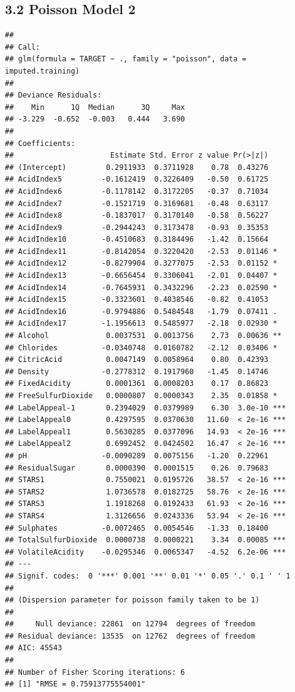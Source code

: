 \documentclass[]{article}
\begin{document}
\hypertarget{poisson-model-2}{%
\subsection{3.2 Poisson Model 2}\label{poisson-model-2}}

\begin{verbatim}
## 
## Call:
## glm(formula = TARGET ~ ., family = "poisson", data = imputed.training)
## 
## Deviance Residuals: 
##    Min      1Q  Median      3Q     Max  
## -3.229  -0.652  -0.003   0.444   3.690  
## 
## Coefficients:
##                      Estimate Std. Error z value Pr(>|z|)    
## (Intercept)         0.2911933  0.3711928    0.78  0.43276    
## AcidIndex5         -0.1612419  0.3226409   -0.50  0.61725    
## AcidIndex6         -0.1178142  0.3172205   -0.37  0.71034    
## AcidIndex7         -0.1521719  0.3169681   -0.48  0.63117    
## AcidIndex8         -0.1837017  0.3170140   -0.58  0.56227    
## AcidIndex9         -0.2944243  0.3173478   -0.93  0.35353    
## AcidIndex10        -0.4510683  0.3184496   -1.42  0.15664    
## AcidIndex11        -0.8142054  0.3220420   -2.53  0.01146 *  
## AcidIndex12        -0.8279904  0.3277075   -2.53  0.01152 *  
## AcidIndex13        -0.6656454  0.3306041   -2.01  0.04407 *  
## AcidIndex14        -0.7645931  0.3432296   -2.23  0.02590 *  
## AcidIndex15        -0.3323601  0.4038546   -0.82  0.41053    
## AcidIndex16        -0.9794886  0.5484548   -1.79  0.07411 .  
## AcidIndex17        -1.1956613  0.5485977   -2.18  0.02930 *  
## Alcohol             0.0037531  0.0013756    2.73  0.00636 ** 
## Chlorides          -0.0340748  0.0160782   -2.12  0.03406 *  
## CitricAcid          0.0047149  0.0058964    0.80  0.42393    
## Density            -0.2778312  0.1917960   -1.45  0.14746    
## FixedAcidity        0.0001361  0.0008203    0.17  0.86823    
## FreeSulfurDioxide   0.0000807  0.0000343    2.35  0.01858 *  
## LabelAppeal-1       0.2394029  0.0379989    6.30  3.0e-10 ***
## LabelAppeal0        0.4297595  0.0370630   11.60  < 2e-16 ***
## LabelAppeal1        0.5630285  0.0377096   14.93  < 2e-16 ***
## LabelAppeal2        0.6992452  0.0424502   16.47  < 2e-16 ***
## pH                 -0.0090289  0.0075156   -1.20  0.22961    
## ResidualSugar       0.0000390  0.0001515    0.26  0.79683    
## STARS1              0.7550021  0.0195726   38.57  < 2e-16 ***
## STARS2              1.0736578  0.0182725   58.76  < 2e-16 ***
## STARS3              1.1918268  0.0192433   61.93  < 2e-16 ***
## STARS4              1.3126656  0.0243336   53.94  < 2e-16 ***
## Sulphates          -0.0072465  0.0054546   -1.33  0.18400    
## TotalSulfurDioxide  0.0000738  0.0000221    3.34  0.00085 ***
## VolatileAcidity    -0.0295346  0.0065347   -4.52  6.2e-06 ***
## ---
## Signif. codes:  0 '***' 0.001 '**' 0.01 '*' 0.05 '.' 0.1 ' ' 1
## 
## (Dispersion parameter for poisson family taken to be 1)
## 
##     Null deviance: 22861  on 12794  degrees of freedom
## Residual deviance: 13535  on 12762  degrees of freedom
## AIC: 45543
## 
## Number of Fisher Scoring iterations: 6
## [1] "RMSE = 0.75913775554001"
\end{verbatim}
\end{document}
